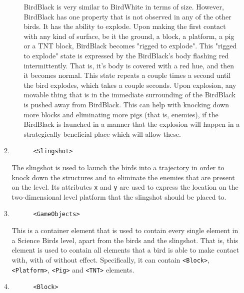 \documentclass[12pt]{dalthesis}
\begin{document}
\begin{enumerate}
\begin{enumerate}
\begin{enumerate}
      BirdBlack is very similar to BirdWhite in terms of size. However, BirdBlack has one property that is not observed in any of the other birds. It has the ability to explode. Upon making the first contact with any kind of surface, be it the ground, a block, a platform, a pig or a TNT block, BirdBlack becomes "rigged to explode". This "rigged to explode" state is expressed by the BirdBlack's body flashing red intermittently. That is, it's body is covered with a red hue, and then it becomes normal. This state repeats a couple times a second until the bird explodes, which takes a couple seconds. Upon explosion, any movable thing that is in the immediate surrounding of the BirdBlack is pushed away from BirdBlack. This can help with knocking down more blocks and eliminating more pigs (that is, enemies), if the BirdBlack is launched in a manner that the explosion will happen in a strategically beneficial place which will allow these.
    \end{enumerate}

    \item

    \begin{lstlisting}
      <Slingshot>
    \end{lstlisting}

    The slingshot is used to launch the birds into a trajectory in order to knock down the structures and to eliminate the enemies that are present on the level. Its attributes \lstinline{x} and \lstinline{y} are used to express the location on the two-dimensional level platform that the slingshot should be placed to.

    \item

    \begin{lstlisting}
      <GameObjects>
    \end{lstlisting}

    This is a container element that is used to contain every single element in a Science Birds level, apart from the birds and the slingshot. That is, this element is used to contain all elements that a bird is able to make contact with, with of without effect. Specifically, it can contain \lstinline{<Block>}, \lstinline{<Platform>}, \lstinline{<Pig>} and \lstinline{<TNT>} elements.

    \item

    \begin{lstlisting}
      <Block>
    \end{lstlisting}


\end{enumerate}
\end{enumerate}
\end{document}
